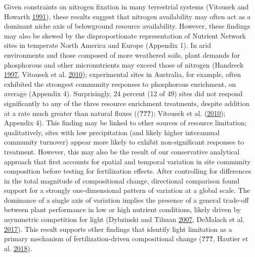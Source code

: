 \documentclass[twoside,12pt,final]{ucthesis-CA2012}
\begin{document}
\begin{ucmainmatter}
Given constraints on nitrogen fixation in many terrestrial systems (Vitousek and Howarth \protect\hyperlink{ref-Vitousek1991}{1991}), these results suggest that nitrogen availability may often act as a dominant niche axis of belowground resource availability. However, these findings may also be skewed by the disproportionate representation of Nutrient Network sites in temperate North America and Europe (Appendix 1). In arid environments and those composed of more weathered soils, plant demands for phosphorous and other micronutrients may exceed those of nitrogen (Handreck \protect\hyperlink{ref-Handreck1997}{1997}, Vitousek et al. \protect\hyperlink{ref-Vitousek2010}{2010}); experimental sites in Australia, for example, often exhibited the strongest community responses to phosphorous enrichment, on average (Appendix 4).
Surprisingly, 24 percent (12 of 49) sites did not respond significantly to any of the three resource enrichment treatments, despite addition at a rate much greater than natural fluxes (({\textbf{???}}); Vitousek et al. (\protect\hyperlink{ref-Vitousek2010}{2010}); Appendix 4). This finding may be linked to other sources of resource limitation; qualitatively, sites with low precipitation (and likely higher interannual community turnover) appear more likely to exhibit non-significant responses to treatment. However, this may also be the result of our conservative analytical approach that first accounts for spatial and temporal variation in site community composition before testing for fertilization effects.
After controlling for differences in the total magnitude of compositional change, directional comparison found support for a strongly one-dimensional pattern of variation at a global scale. The dominance of a single axis of variation implies the presence of a general trade-off between plant performance in low or high nutrient conditions, likely driven by asymmetric competition for light (Dybzinski and Tilman \protect\hyperlink{ref-Dybzinski2007a}{2007}, DeMalach et al. \protect\hyperlink{ref-DeMalach2017a}{2017}). This result supports other findings that identify light limitation as a primary mechanism of fertilization-driven compositional change ({\textbf{???}}, Hautier et al. \protect\hyperlink{ref-Hautier2018}{2018}).

\end{ucmainmatter}
\end{document}
